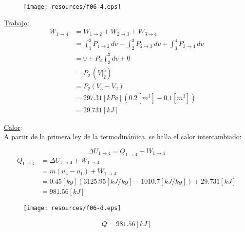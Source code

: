 \documentclass[letter,11pt]{article}
\begin{document}
\begin{enumerate}
\begin{figure}[H]
\centering
\texttt{[image: resources/f06-4.eps]}
\end{figure}

\underline{Trabajo}: \\
\begin{equation*}
    \begin{split}
    W_{1\rightarrow 4} &= W_{1\rightarrow 2} + W_{2\rightarrow 3}
                          + W_{3\rightarrow 4} \\
                       &= \int_1^2 P_{1\rightarrow 2}\,dv
                          + \int_2^3 P_{2\rightarrow 3}\,dv
                          + \int_3^4 P_{3\rightarrow 4}\,dv \\
                       &= 0 + P_2 \int_2^3 dv + 0 \\
                       &= P_2\,(V\Biggr|_2^3) \\
                       &= P_2(V_3-V_2) \\
                       &= 297.31[kPa](0.2[m^3]-0.1[m^3]) \\
                       &= 29.731[kJ]
    \end{split}
\end{equation*}

\underline{Calor}: \\
A partir de la primera ley de la termodinámica, se halla el calor intercambiado:

\begin{equation*}
    \Delta U_{1\rightarrow 4} = Q_{1\rightarrow 4} - W_{1\rightarrow 4}
\end{equation*}
\begin{equation*}
    \begin{split}
        Q_{1\rightarrow 4} &= \Delta U_{1\rightarrow 4} + W_{1\rightarrow 4} \\
                           &= m(u_4 - u_1) + W_{1\rightarrow 4} \\
                           &= 0.45[kg](3125.95[kJ/kg]
                              -1010.7[kJ/kg])+29.731[kJ] \\
                           &= 981.56[kJ]
    \end{split}
\end{equation*}

\begin{figure}[H]
\centering
\texttt{[image: resources/f06-d.eps]}
\end{figure}

\begin{equation*}
\boxed{
    \begin{array}{l}
        Q = 981.56[kJ]
    \end{array}
}
\end{equation*}
\newpage


\end{enumerate}
\end{document}

